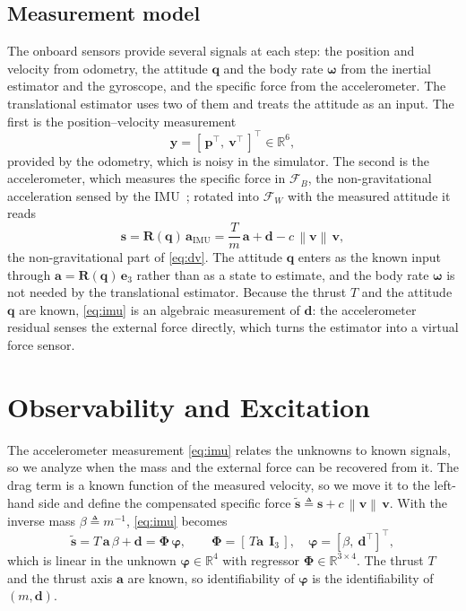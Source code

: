 \documentclass[lettersize,journal]{IEEEtran}
\newcommand{\R}{\mathbb{R}}
\newcommand{\norm}[1]{\left\| #1 \right\|}
\newcommand{\vect}[1]{\bm{#1}}
\newcommand{\mat}[1]{\mathbf{#1}}
\begin{document}
\subsection{Measurement model}
The onboard sensors provide several signals at each step: the position and
velocity from odometry, the attitude $\vect{q}$ and the body rate
$\vect{\omega}$ from the inertial estimator and the gyroscope, and the specific
force from the accelerometer. The translational estimator uses two of them and
treats the attitude as an input. The first is the position--velocity
measurement
\begin{equation}
\vect{y} = [\,\vect{p}^{\!\top},\ \vect{v}^{\!\top}\,]^{\!\top}\in\R^6 ,
\label{eq:y}
\end{equation}
provided by the odometry, which is noisy in the simulator. The second is the
accelerometer, which measures the specific force in $\mathcal{F}_B$, the
non-gravitational acceleration sensed by the IMU~\cite{forster2015imu}; rotated into
$\mathcal{F}_W$ with the measured attitude it reads
\begin{equation}
\vect{s} = \mat{R}(\vect{q})\,\vect{a}_{\text{IMU}}
         = \frac{T}{m}\,\vect{a} + \vect{d} - c\,\norm{\vect{v}}\,\vect{v},
\label{eq:imu}
\end{equation}
the non-gravitational part of \eqref{eq:dv}. The attitude $\vect{q}$ enters as
the known input through $\vect{a}=\mat{R}(\vect{q})\,\vect{e}_3$ rather than as a
state to estimate, and the body rate $\vect{\omega}$ is not needed by the
translational estimator. Because the thrust $T$ and the attitude $\vect{q}$ are
known, \eqref{eq:imu} is an algebraic measurement of $\vect{d}$: the
accelerometer residual senses the external force directly, which turns the
estimator into a virtual force sensor.

\section{Observability and Excitation}\label{sec:obs}

The accelerometer measurement \eqref{eq:imu} relates the unknowns to known
signals, so we analyze when the mass and the external force can be recovered
from it. The drag term is a known function of the measured velocity, so we move
it to the left-hand side and define the compensated specific force
$\tilde{\vect{s}}\triangleq\vect{s}+c\,\norm{\vect{v}}\,\vect{v}$. With the
inverse mass $\beta\triangleq m^{-1}$, \eqref{eq:imu} becomes
\begin{equation}
\tilde{\vect{s}} = T\,\vect{a}\,\beta + \vect{d}
                 = \mat{\Phi}\,\vect{\varphi},
\qquad
\mat{\Phi} = [\,T\vect{a}\ \ \mat{I}_3\,],\quad
\vect{\varphi}=[\beta,\ \vect{d}^{\!\top}]^{\!\top},
\label{eq:regressor}
\end{equation}
which is linear in the unknown $\vect{\varphi}\in\R^4$ with regressor
$\mat{\Phi}\in\R^{3\times4}$. The thrust $T$ and the thrust axis $\vect{a}$ are
known, so identifiability of $\vect{\varphi}$ is the identifiability of
$(m,\vect{d})$.
\end{document}
